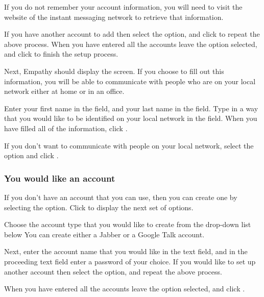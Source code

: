 If you do not remember your account information, you will need to visit the
website of the instant messaging network to retrieve that information.

If you have another account to add then select the  option, 
and click  to repeat the above process. When you 
have entered all the accounts leave the  
option selected, and click  to finish the 
setup process. 

Next, Empathy should display the  screen.
If you choose to fill out this information, you will be able to communicate 
with people who are on your local network either at home or in an office. 

Enter your first name in the  field, and your last name 
in the  field. Type in a way that you would like to be
identified on your local network in the  field. When you 
have filled all of the information, click .

If you don't want to communicate with people on your local network,  
select the  option
and click .

\subsubsection{You would like an account}

If you don't have an account that you can use, then you can create one by 
selecting the  option. Click 
 to display the next set of options. 

Choose the account type that you would like to create from the drop-down list
below  
You can create either a Jabber or a Google Talk account. 

Next, enter the account name that you would like in the text field, and in 
the proceeding text field enter a password of your choice. If you would
like to set up another account then select the  option, and 
repeat the above process. 

When you have entered all the accounts leave the 
option selected, and click .

